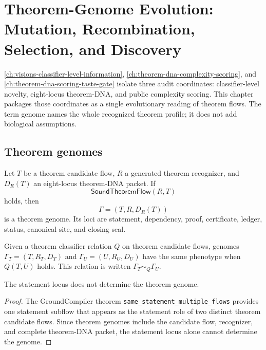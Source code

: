 \chapter{Theorem-Genome Evolution: Mutation, Recombination, Selection, and Discovery}
\label{ch:theorem-genome-evolution}

\autoref{ch:visions-classifier-level-information}, \autoref{ch:theorem-dna-complexity-scoring},
and \autoref{ch:theorem-dna-scoring-taste-gate} isolate three audit
coordinates: classifier-level novelty, eight-locus theorem-DNA, and public
complexity scoring. This chapter packages those coordinates as a single
evolutionary reading of theorem flows. The term genome names the whole
recognized theorem profile; it does not add biological assumptions.

\section{Theorem genomes}
\label{sec:theorem-genome-theorem-genomes}

\begin{definition}
\label{def:theorem-genome}
Let $T$ be a theorem candidate flow, $R$ a generated theorem recognizer, and
$D_R(T)$ an eight-locus theorem-DNA packet. If
$$
\mathsf{SoundTheoremFlow}(R,T)
$$
holds, then
$$
\Gamma=(T,R,D_R(T))
$$
is a theorem genome. Its loci are statement, dependency, proof, certificate,
ledger, status, canonical site, and closing seal.
\end{definition}

\begin{definition}
\label{def:theorem-genome-phenotype}
Given a theorem classifier relation $Q$ on theorem candidate flows, genomes
$\Gamma_T=(T,R_T,D_T)$ and $\Gamma_U=(U,R_U,D_U)$ have the same phenotype when
$Q(T,U)$ holds. This relation is written $\Gamma_T\sim_Q\Gamma_U$.
\end{definition}

\begin{theorem}
\label{thm:theorem-genome-statement-locus-not-determining}
The statement locus does not determine the theorem genome.
\end{theorem}
\begin{proof}
The GroundCompiler theorem \texttt{same\_statement\_multiple\_flows} provides
one statement subflow that appears as the statement role of two distinct
theorem candidate flows. Since theorem genomes include the candidate flow,
recognizer, and complete theorem-DNA packet, the statement locus alone cannot
determine the genome.
\end{proof}

